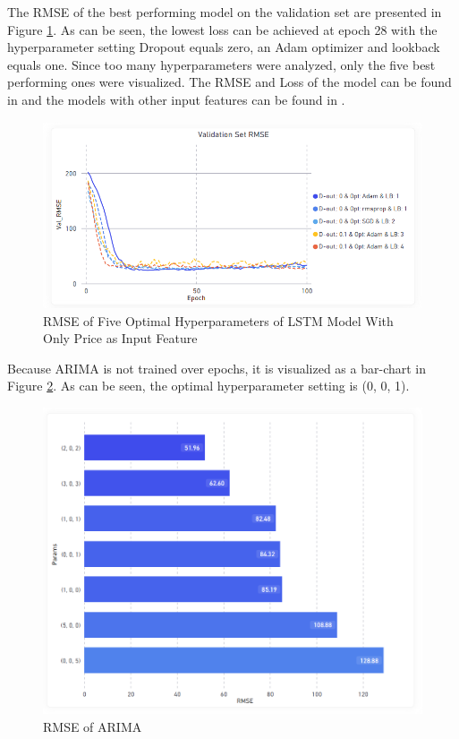 \documentclass[11pt, a4paper]{article}
\begin{document}
The RMSE of the best performing model on the validation set are presented in Figure \ref{fig:lstm_price_rmse_best_params}. As can be seen, the lowest loss can be achieved
at epoch 28 with the hyperparameter setting Dropout equals zero, an Adam optimizer and lookback equals one. Since too many hyperparameters
were analyzed, only the five best performing ones were visualized. 
The RMSE and Loss of the model can be found in  and the models with other input features can be found in .
\begin{figure}[!h]
    \centering
    \includegraphics[scale = 0.45]{Only_Price_Params_RMSE_Validation_Set.png}
    \caption{RMSE of Five Optimal Hyperparameters of LSTM Model With Only Price as Input Feature}
    \label{fig:lstm_price_rmse_best_params}
\end{figure}

Because ARIMA is not trained over epochs, it is visualized as a bar-chart in Figure \ref{fig:arima_rmse}. As can be seen, the optimal hyperparameter setting is (0, 0, 1).

\begin{figure}[!h]
    \centering
    \includegraphics[scale = 0.38]{ARIMA_RMSE.png}
    \caption{RMSE of ARIMA}
    \label{fig:arima_rmse}
\end{figure}
\end{document}
